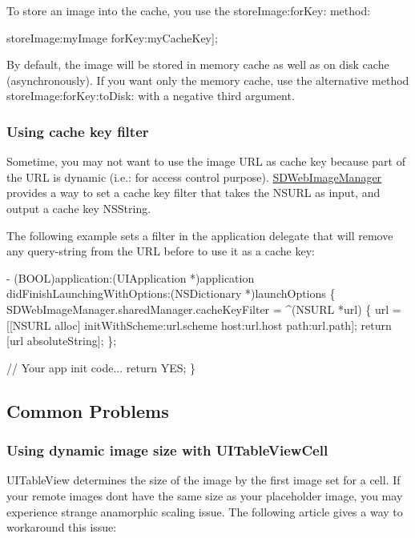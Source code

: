 To store an image into the cache, you use the store\+Image\+:for\+Key\+: method\+:


\begin{DoxyCode}
[[SDImageCache sharedImageCache] storeImage:myImage forKey:myCacheKey];
\end{DoxyCode}


By default, the image will be stored in memory cache as well as on disk cache (asynchronously). If you want only the memory cache, use the alternative method store\+Image\+:for\+Key\+:to\+Disk\+: with a negative third argument.

\subsubsection*{Using cache key filter}

Sometime, you may not want to use the image U\+RL as cache key because part of the U\+RL is dynamic (i.\+e.\+: for access control purpose). \mbox{\hyperlink{interface_s_d_web_image_manager}{S\+D\+Web\+Image\+Manager}} provides a way to set a cache key filter that takes the N\+S\+U\+RL as input, and output a cache key N\+S\+String.

The following example sets a filter in the application delegate that will remove any query-\/string from the U\+RL before to use it as a cache key\+:


\begin{DoxyCode}
- (BOOL)application:(UIApplication *)application didFinishLaunchingWithOptions:(NSDictionary
       *)launchOptions \{
    SDWebImageManager.sharedManager.cacheKeyFilter = ^(NSURL *url) \{
        url = [[NSURL alloc] initWithScheme:url.scheme host:url.host path:url.path];
        return [url absoluteString];
    \};

    // Your app init code...
    return YES;
\}
\end{DoxyCode}


\subsection*{Common Problems }

\subsubsection*{Using dynamic image size with U\+I\+Table\+View\+Cell}

U\+I\+Table\+View determines the size of the image by the first image set for a cell. If your remote images don\textquotesingle{}t have the same size as your placeholder image, you may experience strange anamorphic scaling issue. The following article gives a way to workaround this issue\+:


